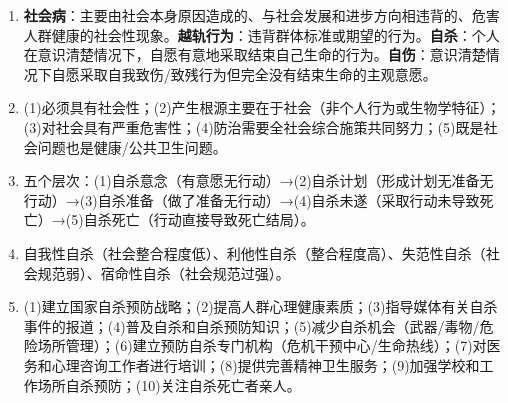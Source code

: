 \begin{enumerate}[leftmargin=*, itemsep=5pt]
    \item \textbf{社会病}：主要由社会本身原因造成的、与社会发展和进步方向相违背的、危害人群健康的社会性现象。\textbf{越轨行为}：违背群体标准或期望的行为。\textbf{自杀}：个人在意识清楚情况下，自愿有意地采取结束自己生命的行为。\textbf{自伤}：意识清楚情况下自愿采取自我致伤/致残行为但完全没有结束生命的主观意愿。
    \item (1)必须具有社会性；(2)产生根源主要在于社会（非个人行为或生物学特征）；(3)对社会具有严重危害性；(4)防治需要全社会综合施策共同努力；(5)既是社会问题也是健康/公共卫生问题。
    \item 五个层次：(1)自杀意念（有意愿无行动）→(2)自杀计划（形成计划无准备无行动）→(3)自杀准备（做了准备无行动）→(4)自杀未遂（采取行动未导致死亡）→(5)自杀死亡（行动直接导致死亡结局）。
    \item 自我性自杀（社会整合程度低）、利他性自杀（整合程度高）、失范性自杀（社会规范弱）、宿命性自杀（社会规范过强）。
    \item (1)建立国家自杀预防战略；(2)提高人群心理健康素质；(3)指导媒体有关自杀事件的报道；(4)普及自杀和自杀预防知识；(5)减少自杀机会（武器/毒物/危险场所管理）；(6)建立预防自杀专门机构（危机干预中心/生命热线）；(7)对医务和心理咨询工作者进行培训；(8)提供完善精神卫生服务；(9)加强学校和工作场所自杀预防；(10)关注自杀死亡者亲人。
\end{enumerate}

\newpage
